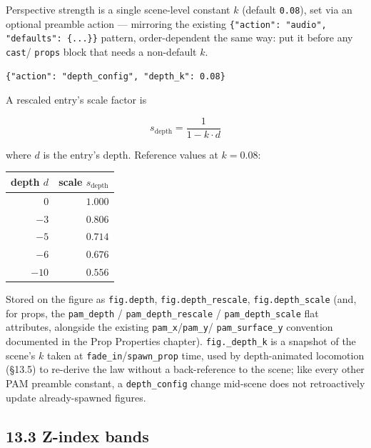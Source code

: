 \documentclass[
  12pt,
  letterpaper,
]{book}
\begin{document}
Perspective strength is a single scene-level constant $k$ (default
\texttt{0.08}), set via an optional preamble action --- mirroring the
existing \texttt{\{"action": "audio", "defaults": \{...\}\}} pattern,
order-dependent the same way: put it before any \texttt{cast}/
\texttt{props} block that needs a non-default $k$.

\begin{verbatim}
{"action": "depth_config", "depth_k": 0.08}
\end{verbatim}

A rescaled entry's scale factor is

\[ s_{\mathrm{depth}} = \frac{1}{1 - k \cdot d} \]

where $d$ is the entry's depth. Reference values at $k = 0.08$:

\begin{center}
\begin{tabular}{r r}
depth $d$ & scale $s_{\mathrm{depth}}$ \\
\hline
$0$    & $1.000$ \\
$-3$   & $0.806$ \\
$-5$   & $0.714$ \\
$-6$   & $0.676$ \\
$-10$  & $0.556$ \\
\end{tabular}
\end{center}

Stored on the figure as \texttt{fig.depth}, \texttt{fig.depth\_rescale},
\texttt{fig.depth\_scale} (and, for props, the \texttt{pam\_depth} /
\texttt{pam\_depth\_rescale} / \texttt{pam\_depth\_scale} flat
attributes, alongside the existing \texttt{pam\_x}/\texttt{pam\_y}/
\texttt{pam\_surface\_y} convention documented in the Prop Properties
chapter). \texttt{fig.\_depth\_k} is a snapshot of the scene's $k$
taken at \texttt{fade\_in}/\texttt{spawn\_prop} time, used by
depth-animated locomotion (\S13.5) to re-derive the law without a
back-reference to the scene; like every other PAM preamble constant, a
\texttt{depth\_config} change mid-scene does not retroactively update
already-spawned figures.

\subsection{\texorpdfstring{13.3 Z-index bands}{13.3 Z-index bands}}\label{z-index-bands}
\end{document}
